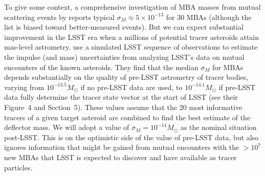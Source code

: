 \documentclass[linenumbers, onecolumn]{aastex631}
\newcommand\edited[1]{{\color{red} {#1}}}
\begin{document}
To give some context, a
comprehensive investigation of MBA masses from mutual scattering
events by \citet{goffin} reports typical $\sigma_M\approx
5\times10^{-13}$ for 30 MBAs (although the list is biased toward
better-measured events). But we can expect substantial improvement
in the LSST era when a millions of potential tracer asteroids attain
mas-level astrometry. \citet{negin} use a simulated LSST sequence of
observations to estimate the impulse (and mass) uncertainties from
analyzing LSST's data on mutual encounters of the known asteroids.
\edited{ They find
that the median $\sigma_M$ for MBAs depends substantially on the quality of
pre-LSST astrometry of tracer bodies, varying from $10^{-13.5} M_\odot$ if no
pre-LSST data are used, to $10^{-14.1} M_\odot$ if pre-LSST data fully determine
the tracer state vector at the start of LSST (see their Figure~4 and Section~5).  These values assume that the 20
most informative tracers of a given target asteroid are combined to find the
best estimate of the deflector mass.  We will adopt a value of
$\sigma_M=10^{-14} M_\odot$  as the nominal situation post-LSST. This is on the
optimistic side of the value of pre-LSST data, but also ignores information that
might be gained from mutual encounters with the $>10^7$ new MBAs that LSST is
expected to discover and have available as tracer particles.}




\end{document}
